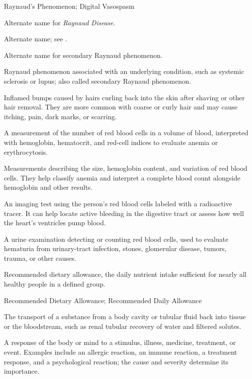 \synonyms
Raynaud's Phenomenon; Digital Vasospasm

 Alternate name for \textit{Raynaud Disease}.

 Alternate name; see .

 Alternate name for secondary Raynaud phenomenon.

 Raynaud phenomenon associated with an underlying condition, such as systemic sclerosis or lupus; also called secondary Raynaud phenomenon.

 Inflamed bumps caused by hairs curling back into the skin after shaving or other hair removal. They are more common with coarse or curly hair and may cause itching, pain, dark marks, or scarring.

 A measurement of the number of red blood cells in a volume of blood, interpreted with hemoglobin, hematocrit, and red-cell indices to evaluate anemia or erythrocytosis.

 Measurements describing the size, hemoglobin content, and variation of red blood cells. They help classify anemia and interpret a complete blood count alongside hemoglobin and other results.

 An imaging test using the person's red blood cells labeled with a radioactive tracer. It can help locate active bleeding in the digestive tract or assess how well the heart's ventricles pump blood.

 A urine examination detecting or counting red blood cells, used to evaluate hematuria from urinary-tract infection, stones, glomerular disease, tumors, trauma, or other causes.

 Recommended dietary allowance, the daily nutrient intake sufficient for nearly all healthy people in a defined group.

\synonyms
Recommended Dietary Allowance; Recommended Daily Allowance

 The transport of a substance from a body cavity or tubular fluid back into tissue or the bloodstream, such as renal tubular recovery of water and filtered solutes.

 A response of the body or mind to a stimulus, illness, medicine, treatment, or event. Examples include an allergic reaction, an immune reaction, a treatment response, and a psychological reaction; the cause and severity determine its importance.

